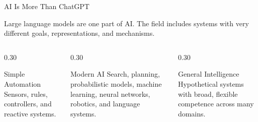 \documentclass[aspectratio=169]{beamer}
\begin{document}
\begin{frame}{AI Is More Than ChatGPT}
  \begin{keyidea}
    Large language models are one part of AI. The field includes systems with very different goals, representations, and mechanisms.
  \end{keyidea}
  \vspace{0.12in}
  \begin{columns}[T,onlytextwidth]
    \begin{column}{0.30\textwidth}
      \begin{block}{Simple Automation}
        Sensors, rules, controllers, and reactive systems.
      \end{block}
    \end{column}
    \begin{column}{0.30\textwidth}
      \begin{block}{Modern AI}
        Search, planning, probabilistic models, machine learning, neural networks, robotics, and language systems.
      \end{block}
    \end{column}
    \begin{column}{0.30\textwidth}
      \begin{block}{General Intelligence}
        Hypothetical systems with broad, flexible competence across many domains.
      \end{block}
    \end{column}
  \end{columns}
\end{frame}
\end{document}
